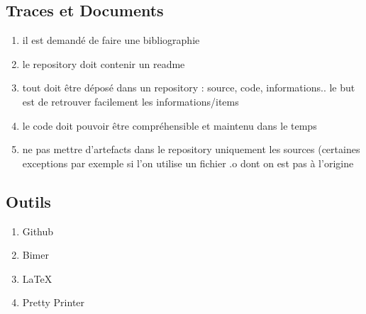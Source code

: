 \documentclass{article}
\begin{document}
\subsection{Traces et Documents}
\begin{enumerate}
    \item il est demandé de faire une bibliographie
    \item le repository doit contenir un readme
    \item tout doit être déposé dans un repository : source, code, informations.. le but est de retrouver facilement les informations/items
    \item le code doit pouvoir être compréhensible et maintenu dans le temps
    \item ne pas mettre d’artefacts dans le repository uniquement les sources (certaines exceptions par exemple si l’on utilise un fichier .o dont on est pas à l’origine

\end{enumerate}

\subsection{Outils}
\begin{enumerate}
    \item Github
    \item Bimer
    \item LaTeX
    \item Pretty Printer
\end{enumerate}
\end{document}
